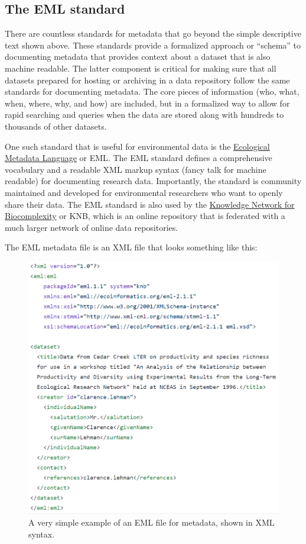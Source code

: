 \documentclass[
]{book}
\begin{document}
\hypertarget{eml}{%
\subsection{The EML standard}\label{eml}}

There are countless standards for metadata that go beyond the simple descriptive text shown above. These standards provide a formalized approach or ``schema'' to documenting metadata that provides context about a dataset that is also machine readable. The latter component is critical for making sure that all datasets prepared for hosting or archiving in a data repository follow the same standards for documenting metadata. The core pieces of information (who, what, when, where, why, and how) are included, but in a formalized way to allow for rapid searching and queries when the data are stored along with hundreds to thousands of other datasets.

One such standard that is useful for environmental data is the \href{https://eml.ecoinformatics.org/}{Ecological Metadata Language} or EML. The EML standard defines a comprehensive vocabulary and a readable XML markup syntax (fancy talk for machine readable) for documenting research data. Importantly, the standard is community maintained and developed for environmental researchers who want to openly share their data. The EML standard is also used by the \href{https://knb.ecoinformatics.org/}{Knowledge Network for Biocomplexity} or KNB, which is an online repository that is federated with a much larger network of online data repositories.

The EML metadata file is an XML file that looks something like this:

\begin{figure}

{\centering \includegraphics[width=0.7\linewidth]{img/emlsimple} 

}

\caption{A very simple example of an EML file for metadata, shown in XML syntax.}\label{fig:emlsimple}
\end{figure}
\end{document}

